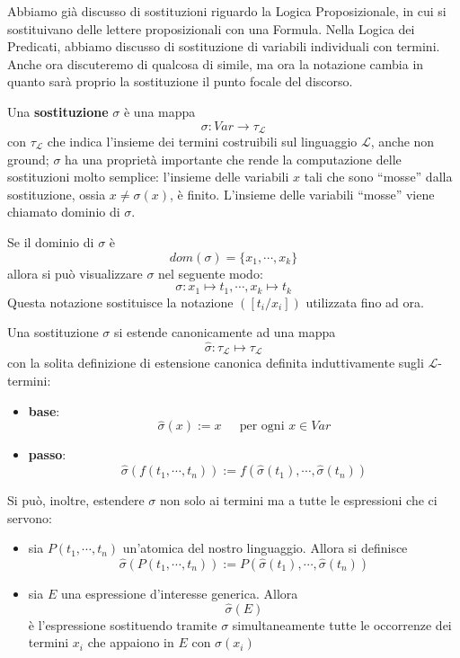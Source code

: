 Abbiamo già discusso di sostituzioni riguardo la Logica Proposizionale, in cui 
si sostituivano delle lettere proposizionali con una Formula. Nella Logica dei Predicati, 
abbiamo discusso di sostituzione di variabili individuali con termini. Anche 
ora discuteremo di qualcosa di simile, ma ora la notazione cambia in quanto 
sarà proprio la sostituzione il punto focale del discorso. 

\begin{defi}[Sostituzione]
Una \textbf{sostituzione} $\sigma$ è una mappa 
$$
\sigma: Var \rightarrow \tau_{\mathscr{L}}
$$
con $\tau_{\mathscr{L}}$ che indica l'insieme dei termini costruibili sul linguaggio $\mathscr{L}$, anche non ground; $\sigma$ ha una proprietà importante che rende la computazione delle sostituzioni molto semplice: l'insieme delle variabili $x$ tali che sono ``mosse'' dalla sostituzione, ossia $x \neq \sigma(x)$, è finito. 
L'insieme  delle variabili ``mosse'' viene chiamato dominio di $\sigma$. 
\end{defi}

Se il dominio di $\sigma$ è 
$$
dom(\sigma) = \{x_1, \cdots, x_k\}
$$
allora si può visualizzare $\sigma$ nel seguente modo: 
$$
\sigma: x_1 \mapsto t_1, \cdots, x_k \mapsto t_k
$$
Questa notazione sostituisce la notazione $([t_i/x_i])$ utilizzata fino ad ora. 

\begin{defi}
Una sostituzione $\sigma$ si estende canonicamente ad una mappa 
$$
\hat{\sigma}: \tau_\mathscr{L} \mapsto \tau_\mathscr{L}
$$
con la solita definizione di estensione canonica definita induttivamente sugli $\mathscr{L}$-termini:
\begin{itemize}
  \item{\textbf{base}}:
    $$
    \hat{\sigma}(x)  := x ~~~~~ \text{ per ogni } x \in Var 
    $$
    \item{\textbf{passo}}:
    $$
    \hat{\sigma}(f(t_1, \cdots, t_n)) := f(\hat{\sigma}(t_1), \cdots, \hat{\sigma}(t_n))
    $$
\end{itemize}

Si può, inoltre, estendere $\sigma$ non solo ai termini ma a tutte le espressioni che ci servono:
\begin{itemize}
  \item sia $P(t_1, \cdots, t_n)$ un'atomica del nostro linguaggio. Allora si definisce 
  $$
  \hat{\sigma}(P(t_1, \cdots, t_n)) := P(\hat{\sigma}(t_1), \cdots, \hat{\sigma}(t_n))
  $$
  \item sia $E$ una espressione d'interesse generica. Allora 
  $$
  \hat{\sigma}(E)
  $$
  è l'espressione sostituendo tramite $\sigma$ simultaneamente tutte le occorrenze dei termini $x_i$ che appaiono in $E$ con $\sigma(x_i)$
\end{itemize}
\end{defi}

